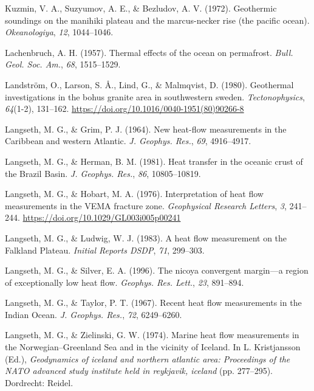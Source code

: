 \documentclass[draft,linenumbers]{agujournal2018}
\begin{document}
\leavevmode{}%
Kuzmin, V. A., Suzyumov, A. E., \& Bezludov, A. V. (1972). Geothermic
soundings on the manihiki plateau and the marcus-necker rise (the
pacific ocean). \emph{Okeanologiya}, \emph{12}, 1044--1046.

\leavevmode{}%
Lachenbruch, A. H. (1957). Thermal effects of the ocean on permafrost.
\emph{Bull. Geol. Soc. Am.}, \emph{68}, 1515--1529.

\leavevmode{}%
Landström, O., Larson, S. Å., Lind, G., \& Malmqvist, D. (1980).
Geothermal investigations in the bohus granite area in southwestern
sweden. \emph{Tectonophysics}, \emph{64}(1-2), 131--162.
\url{https://doi.org/10.1016/0040-1951(80)90266-8}

\leavevmode{}%
Langseth, M. G., \& Grim, P. J. (1964). New heat-flow measurements in
the {Caribbean and western Atlantic}. \emph{J. Geophys. Res.},
\emph{69}, 4916--4917.

\leavevmode{}%
Langseth, M. G., \& Herman, B. M. (1981). Heat transfer in the oceanic
crust of the {Brazil Basin}. \emph{J. Geophys. Res.}, \emph{86},
10805--10819.

\leavevmode{}%
Langseth, M. G., \& Hobart, M. A. (1976). Interpretation of heat flow
measurements in the VEMA fracture zone. \emph{Geophysical Research
Letters}, \emph{3}, 241--244.
\url{https://doi.org/10.1029/GL003i005p00241}

\leavevmode{}%
Langseth, M. G., \& Ludwig, W. J. (1983). A heat flow measurement on the
{Falkland Plateau}. \emph{Initial Reports DSDP}, \emph{71}, 299--303.

\leavevmode{}%
Langseth, M. G., \& Silver, E. A. (1996). The nicoya convergent
margin---a region of exceptionally low heat flow. \emph{Geophys. Res.
Lett.}, \emph{23}, 891--894.

\leavevmode{}%
Langseth, M. G., \& Taylor, P. T. (1967). Recent heat flow measurements
in the {Indian Ocean}. \emph{J. Geophys. Res.}, \emph{72}, 6249--6260.

\leavevmode{}%
Langseth, M. G., \& Zielinski, G. W. (1974). Marine heat flow
measurements in the {Norwegian--Greenland Sea} and in the vicinity of
{Iceland}. In L. Kristjansson (Ed.), \emph{Geodynamics of iceland and
northern atlantic area: Proceedings of the NATO advanced study institute
held in reykjavik, iceland} (pp. 277--295). Dordrecht: Reidel.
\end{document}
